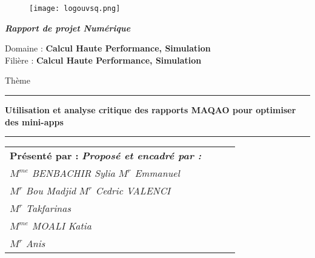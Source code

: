 \begin{titlepage}


	\begin{center}
	
		
		\begin{figure}[H]
		\begin{center}
			\texttt{[image: logouvsq.png]}
	
		\end{center}
		
	\end{figure}
		
		\large{\emph{{{ \it \bf {Rapport de projet Numérique }}}}}\\
		\vspace{0.1cm}
		\normalsize
		\begin{center}
	
			Domaine : \textbf{Calcul Haute Performance, Simulation} \\
			Filière : \textbf {Calcul Haute Performance, Simulation}\\
	
		\end{center}
		
		
		\vspace{0.09cm}
		\Huge{Thème}\\
		\noindent\rule{\textwidth}{0.1mm}
		\Large{{\textbf{Utilisation et analyse critique des rapports MAQAO pour optimiser des mini-apps}}}
		\noindent\rule{\textwidth}{0.1mm}
	\end{center}
	\begin{center}
		\normalsize %
		\vspace{1.5cm}

		\begin{tabular}{llll}

			\vspace{0.09cm}
			\textbf{Présenté par :} \hspace{9cm} \textsl{\textbf{Proposé et encadré par :}}\\
			\vspace{0.1cm}
			$M^{me}$ \textsl{BENBACHIR Sylia}
			\hspace{8cm}\textsl{$M^{r}$ Emmanuel}\\ 
		    $M^{r}$ \textsl{Bou Madjid}
		    \hspace{9.5cm}\textsl{$M^{r}$ Cedric VALENCI}\\
		    $M^{r}$ \textsl{Takfarinas}\\
		    $M^{me}$ \textsl{MOALI Katia}\\
		    $M^{r}$ \textsl{Anis}\\
			

\end{tabular}
\end{center}
\end{titlepage}
